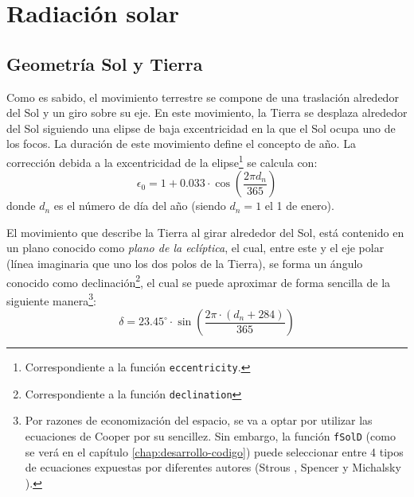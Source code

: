 \section{Radiación solar}
\label{sec:org5b8c595}
\label{radiacion-solar}
\subsection{Geometría Sol y Tierra}
\label{sec:orgc2f94cc}
Como es sabido, el movimiento terrestre se compone de una traslación alrededor del Sol y un giro sobre su eje. En este movimiento, la Tierra se desplaza alrededor del Sol siguiendo una elipse de baja excentricidad en la que el Sol ocupa uno de los focos. La duración de este movimiento define el concepto de año. La corrección debida a la excentricidad de la elipse\footnote{Correspondiente a la función \texttt{eccentricity}.} se calcula con: 
\begin{equation}
\epsilon_0=1+0.033\cdot \cos(\frac{2\pi d_n}{365})
\end{equation}
donde \(d_n\) es el número de día del año (siendo \(d_n=1\) el 1 de enero). 

El movimiento que describe la Tierra al girar alrededor del Sol, está contenido en un plano conocido como \emph{plano de la eclíptica}, el cual, entre este y el eje polar (línea imaginaria que uno los dos polos de la Tierra), se forma un ángulo conocido como declinación\footnote{Correspondiente a la función \texttt{declination}}, el cual se puede aproximar de forma sencilla de la siguiente manera\footnote{Por razones de economización del espacio, se va a optar por utilizar las ecuaciones de Cooper \cite{Cooper1969} por su sencillez. Sin embargo, la función \texttt{fSolD} (como se verá en el capítulo \ref{chap:desarrollo-codigo}) puede seleccionar entre 4 tipos de ecuaciones expuestas por diferentes autores (Strous \cite{Strous2011}, Spencer \cite{Spencer1971} y Michalsky \cite{Michalsky1988}).}: 
\begin{equation}
\delta=23.45^\circ \cdot \sin(\frac{2\pi \cdot (d_n+284)}{365})
\end{equation}

